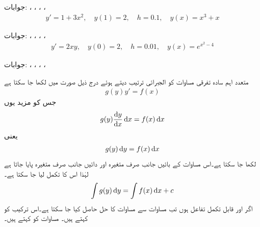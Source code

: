 جوابات: ، ، ، ، 
\begin{align*}
y'=1+3x^2,\quad y(1)=2,\quad h=0.1,\quad y(x)=x^3+x
\end{align*}

جوابات: ، ، ، ، 
\begin{align*}
y'=2xy,\quad y(0)=2,\quad h=0.01,\quad y(x)=e^{x^2-4}
\end{align*}

جوابات: ، ، ، ، 

متعدد اہم سادہ تفرقی مساوات کو الجبرائی ترتیب دیتے ہوئے درج ذیل صورت میں لکھا جا سکتا ہے
\begin{align}\label{مساوات_سادہ_اول_قابل_علیحدگی-الف}
g(y)y'=f(x)
\end{align}
جس کو مزید یوں
\begin{align*}
g(y)\frac{\dif y}{\dif x} \dif x=f(x) \dif x
\end{align*}
یعنی
\begin{align*}
g(y)\dif y=f(x) \dif x
\end{align*}
لکھا جا سکتا ہے۔اس مساوات کے بائیں جانب صرف  متغیرہ اور دائیں جانب صرف  متغیرہ پایا جاتا ہے لہٰذا اس کا تکمل لیا جا سکتا ہے۔
\begin{align}\label{مساوات_سادہ_اول_قابل_علیحدگی-ب}
\int g(y)\dif y=\int f(x) \dif x+c
\end{align}
اگر  اور  قابل تکمل تفاعل ہوں تب مساوات  سے مساوات  کا حل حاصل کیا جا سکتا ہے۔اس ترکیب کو  کہتے ہیں۔ مساوات  کو  کہتے ہیں۔

